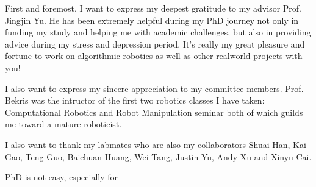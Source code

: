 
\begin{acknowledgments}
First and foremost, I want to express my deepest gratitude to my advisor Prof. Jingjin Yu. 
He has been extremely helpful during my PhD journey 
not only in funding my study and helping me with academic challenges,
but also in providing advice during my stress and depression period. 
It's really my great pleasure and fortune to work on algorithmic robotics 
as well as other realworld projects with you!


I also want to express my sincere appreciation to my committee members. 
Prof. Bekris was the intructor of the first two robotics classes I have taken: 
Computational Robotics and Robot Manipulation seminar both of which guilds me toward a mature roboticist.

I also want to thank my labmates who are also my collaborators Shuai Han, 
Kai Gao, Teng Guo, Baichuan Huang, Wei Tang, Justin Yu, Andy Xu and Xinyu Cai. 

PhD is not easy, especially for

\end{acknowledgments}
